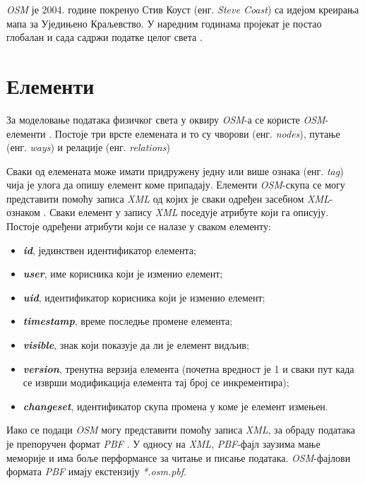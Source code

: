 \documentclass[12pt,oneside]{memoir}
\begin{document}
\textit{OSM} је 2004. године покренуо Стив Коуст (енг. \textit{Steve Coast}) са идејом креирања мапа за Уједињено Краљевство. У наредним годинама пројекат је постао глобалан и сада садржи податке целог света \cite{osm_wiki}.

\section{Елементи}
\label{sec:osm_elementi}

За моделовање података физичког света у оквиру \textit{OSM}-а се користе \textit{OSM}-елементи \cite{osm_wiki}. Постоје три врсте елемената и то су чворови (енг. \textit{nodes}), путање (енг. \textit{ways}) и релације (енг. \textit{relations})

Сваки од елемената може имати придружену једну или више ознака (енг. \textit{tag}) чија је улога да опишу елемент коме припадају. Елементи \textit{OSM}-скупа се могу представити помоћу записа \textit{XML}  од којих је сваки одређен засебном \textit{XML}-ознаком \cite{osm_xml}. Сваки елемент у запису \textit{XML} поседује атрибуте који га описују. Постоје одређени атрибути који се налазе у сваком елементу:

\begin{itemize}
	\item \textbf{\textit{id}}, јединствен идентификатор елемента;
	\item \textbf{\textit{user}}, име корисника који је изменио елемент;
	\item \textbf{\textit{uid}}, идентификатор корисника који је изменио елемент;
	\item \textbf{\textit{timestamp}}, време последње промене елемента;
	\item \textbf{\textit{visible}}, знак који показује да ли је елемент видљив;
	\item \textbf{\textit{version}}, тренутна верзија елемента (почетна вредност је 1 и сваки пут када се изврши модификација елемента тај број се инкрементира);
	\item \textbf{\textit{changeset}}, идентификатор скупа промена у коме је елемент измењен.
\end{itemize}

Иако се подаци \textit{OSM} могу представити помоћу записа \textit{XML}, за обраду података је препоручен формат \textit{PBF} \cite{osm_pbf_format}. У односу на \textit{XML}, \textit{PBF}-фајл заузима мање меморије и има боље перформансе за читање и писање података. \textit{OSM}-фајлови формата \textit{PBF} имају екстензију \textit{*.osm.pbf}. 
\end{document}
